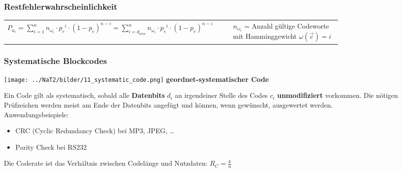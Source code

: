 \subsubsection{Restfehlerwahrscheinlichkeit }
\renewcommand{\arraystretch}{1.4}
\begin{tabular}[c]{ p{0.5\linewidth} p{0.3\linewidth} }
$P_{u_c} = \sum\limits_{i=1}^{n}n_{\omega_i} \cdot {p_e}^i \cdot (1-p_e)^{n-i} = \sum\limits_{i=d_{min}}^{n}n_{\omega_i} \cdot {p_e}^i \cdot (1-p_e)^{n-i}$
&$n_{\omega_i}$ = Anzahl gültige Codeworte mit Hamminggewicht $\omega(\vec{c}) = i$\\
\end{tabular}
\renewcommand{\arraystretch}{1}

\subsubsection{Systematische Blockcodes }
\begin{minipage}{5.5cm}
	\texttt{[image: ../NaT2/bilder/11\_systematic\_code.png]}
	\centering \textbf{geordnet-systematischer Code}
\end{minipage}
\begin{minipage}{12.8cm}
	Ein Code gilt als systematisch, sobald alle \textbf{Datenbits} $d_i$ an irgendeiner Stelle des Codes $c_i$
	\textbf{unmodifiziert} vorkommen. Die nötigen Prüfzeichen werden meist am Ende
	der Datenbits angefügt und können, wenn gewünscht, ausgewertet werden.\\ Anwendungsbeispiele:
	\begin{itemize}
    	\item CRC (Cyclic Redundancy Check) bei MP3, JPEG, \ldots
    	\item Parity Check bei RS232
  	\end{itemize}	
	Die Coderate ist das Verhältnis zwischen Codelänge und Nutzdaten: $R_C = \frac{k}{n}$
\end{minipage} 

